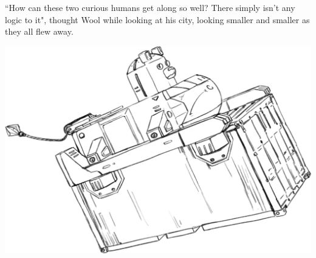 ``How can these two curious humans get along so well? There simply isn't any logic to it", thought Wool while looking at his city, looking smaller and smaller as they all flew away.

\begin{center}
    \includegraphics[width=.8\textwidth]{Assets/shipwithcontainer}    
\end{center}
